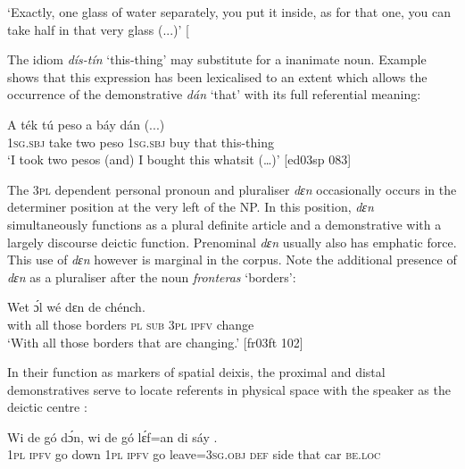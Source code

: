\glt ‘Exactly, one glass of water separately, you put it inside, as for that one, you can 
take half in that very glass (...)’ [\textstylePichiexamplenumberZchnZchn{dj03do 054]}
\z

The idiom \textit{dís-tín} ‘this-thing’ may substitute for a inanimate noun. Example  shows that this expression has been lexicalised to an extent which allows the occurrence of the demonstrative \textit{dán} ‘that’ with its full referential meaning: 


\ea%
    \label{ex:key:203}
    \gll A    ték    tú  peso  a    báy  dán      (...)\\
\textsc{1sg.sbj}  take    two  peso  \textsc{1sg.sbj}  buy  that    this-thing\\

\glt ‘I took two pesos (and) I bought this whatsit (…)’ [ed03sp 083]
\z

The \textsc{3pl} dependent personal pronoun and pluraliser \textit{dɛn} occasionally occurs in the determiner position at the very left of the NP. In this position, \textit{dɛn} simultaneously functions as a plural definite article and a demonstrative with a largely discourse deictic function. Prenominal \textit{dɛn} usually also has emphatic force. This use of \textit{dɛn} however is marginal in the corpus. Note the additional presence of \textit{dɛn} as a pluraliser after the noun \textit{fronteras} ‘borders’:   

\ea%
\label{ex:key:204}
\gll Wet    ɔ́l          wé  dɛn  de  chénch.\\
with    all  those  borders    \textsc{pl}  \textsc{sub}  \textsc{3pl}  \textsc{ipfv}  change\\

\glt ‘With all those borders that are changing.’ [fr03ft 102]
\z

In their function as markers of spatial deixis, the proximal and distal demonstratives serve to locate referents in physical space with the speaker as the deictic centre :


\ea%
    \label{ex:key:205}
    \gll Wi  de  gó  dɔ́n,    wi  de  gó  lɛ́f=an    di  sáy
    \textstylePichiexamplespaceZchn{} .\\
\textsc{1pl}  \textsc{ipfv}  go  down  \textsc{1pl}  \textsc{ipfv}  go  leave=\textsc{3sg.obj}  \textsc{def}  side
that    car    \textsc{be.loc}\\

